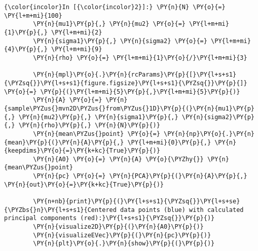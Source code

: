     \begin{Verbatim}[commandchars=\\\{\}]
{\color{incolor}In [{\color{incolor}2}]:} \PY{n}{N} \PY{o}{=} \PY{l+m+mi}{100}
        \PY{n}{mu1}\PY{p}{,} \PY{n}{mu2} \PY{o}{=} \PY{l+m+mi}{1}\PY{p}{,} \PY{l+m+mi}{2}
        \PY{n}{sigma1}\PY{p}{,} \PY{n}{sigma2} \PY{o}{=} \PY{l+m+mi}{4}\PY{p}{,} \PY{l+m+mi}{9}
        \PY{n}{rho} \PY{o}{=} \PY{l+m+mi}{1}\PY{o}{/}\PY{l+m+mi}{3}
        
        \PY{n}{mpl}\PY{o}{.}\PY{n}{rcParams}\PY{p}{[}\PY{l+s+s1}{\PYZsq{}}\PY{l+s+s1}{figure.figsize}\PY{l+s+s1}{\PYZsq{}}\PY{p}{]} \PY{o}{=} \PY{p}{(}\PY{l+m+mi}{5}\PY{p}{,}\PY{l+m+mi}{5}\PY{p}{)}
        \PY{n}{A} \PY{o}{=} \PY{n}{sample\PYZus{}mvn2D\PYZus{}from\PYZus{}1D}\PY{p}{(}\PY{n}{mu1}\PY{p}{,} \PY{n}{mu2}\PY{p}{,} \PY{n}{sigma1}\PY{p}{,} \PY{n}{sigma2}\PY{p}{,} \PY{n}{rho}\PY{p}{,} \PY{n}{N}\PY{p}{)}
        \PY{n}{mean\PYZus{}point} \PY{o}{=} \PY{n}{np}\PY{o}{.}\PY{n}{mean}\PY{p}{(}\PY{n}{A}\PY{p}{,} \PY{l+m+mi}{0}\PY{p}{,} \PY{n}{keepdims}\PY{o}{=}\PY{k+kc}{True}\PY{p}{)}
        \PY{n}{A0} \PY{o}{=} \PY{n}{A} \PY{o}{\PYZhy{}} \PY{n}{mean\PYZus{}point}
        \PY{n}{pc} \PY{o}{=} \PY{n}{PCA}\PY{p}{(}\PY{n}{A}\PY{p}{,} \PY{n}{out}\PY{o}{=}\PY{k+kc}{True}\PY{p}{)}
        
        \PY{n+nb}{print}\PY{p}{(}\PY{l+s+s1}{\PYZsq{}}\PY{l+s+se}{\PYZbs{}n}\PY{l+s+s1}{Centered data points (blue) with calculated principal components (red):}\PY{l+s+s1}{\PYZsq{}}\PY{p}{)}
        \PY{n}{visualize2D}\PY{p}{(}\PY{n}{A0}\PY{p}{)}
        \PY{n}{visualizeEVec}\PY{p}{(}\PY{n}{pc}\PY{p}{)}
        \PY{n}{plt}\PY{o}{.}\PY{n}{show}\PY{p}{(}\PY{p}{)}
        

\end{Verbatim}
